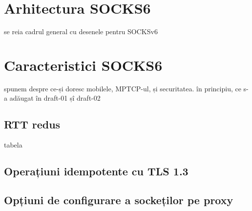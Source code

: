 \chapter{Arhitectura SOCKS6}
\label{sec:arch_upb}

se reia cadrul general cu desenele pentru SOCKSv6

\chapter{Caracteristici SOCKS6}
spunem despre ce-și doresc mobilele, MPTCP-ul, și securitatea.
în principiu, ce s-a adăugat în draft-01 șî draft-02
\label{sec:arch_upb}


\section{RTT redus}
tabela 
\section{Operațiuni idempotente cu TLS 1.3}
\section{Opțiuni de configurare a sockeților pe proxy}

